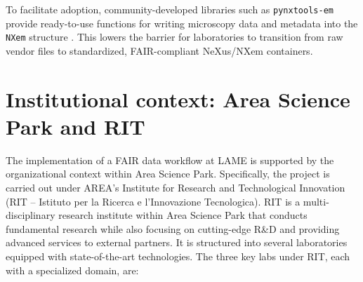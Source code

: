 To facilitate adoption, community-developed libraries such as \texttt{pynxtools-em} provide ready-to-use functions for writing microscopy data and metadata into the \texttt{NXem} structure \parencite{pynxtools_nexus_validation}. 
This lowers the barrier for laboratories to transition from raw vendor files to standardized, FAIR-compliant NeXus/NXem containers.

\section{Institutional context: Area Science Park and RIT}

The implementation of a FAIR data workflow at LAME is supported by the organizational context within Area Science Park. Specifically, the project is carried out under AREA’s Institute for Research and Technological Innovation (RIT – Istituto per la Ricerca e l’Innovazione Tecnologica). RIT is a multi-disciplinary research institute within Area Science Park that conducts fundamental research while also focusing on cutting-edge R\&D and providing advanced services to external partners. It is structured into several laboratories equipped with state-of-the-art technologies. The three key labs under RIT, each with a specialized domain, are:

